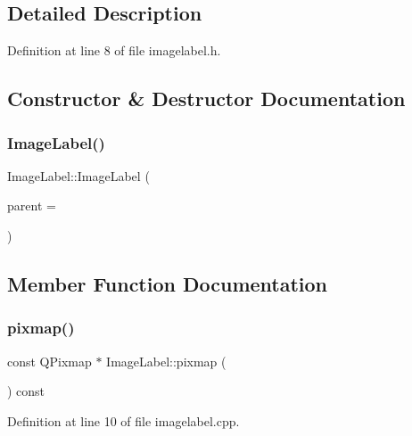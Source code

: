 \subsection{Detailed Description}


Definition at line 8 of file imagelabel.\+h.



\subsection{Constructor \& Destructor Documentation}
\mbox{\label{class_image_label_a01bf7ab77bbe3d5d3f58b1cdcccc8667}} 
\subsubsection{\texorpdfstring{ImageLabel()}{ImageLabel()}}
{\footnotesize\ttfamily Image\+Label\+::\+Image\+Label (\begin{DoxyParamCaption}\item[{Q\+Widget $\ast$}]{parent = {} }\end{DoxyParamCaption})\hspace{0.3cm}{\ttfamily [explicit]}}



\subsection{Member Function Documentation}
\mbox{\label{class_image_label_a0ecf28451887336438cccfe9599a15c2}} 
\subsubsection{\texorpdfstring{pixmap()}{pixmap()}}
{\footnotesize\ttfamily const Q\+Pixmap $\ast$ Image\+Label\+::pixmap (\begin{DoxyParamCaption}{ }\end{DoxyParamCaption}) const}



Definition at line 10 of file imagelabel.\+cpp.

\mbox{\label{class_image_label_a53568d0398cc9e07d67a5cec1da98ad1}} 
